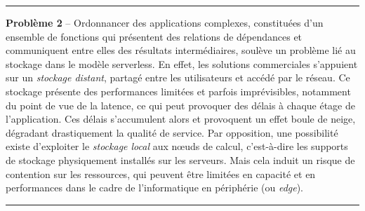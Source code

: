 
\begin{center}
    \rule{4cm}{0.4pt}
\end{center}

\textbf{Problème 2} -- Ordonnancer des applications complexes, constituées d'un ensemble de fonctions qui présentent des relations de dépendances et communiquent entre elles des résultats intermédiaires, soulève un problème lié au stockage dans le modèle serverless. En effet, les solutions commerciales s'appuient sur un \textit{stockage distant}, partagé entre les utilisateurs et accédé par le réseau. Ce stockage présente des performances limitées et parfois imprévisibles, notamment du point de vue de la latence, ce qui peut provoquer des délais à chaque étage de l'application. Ces délais s'accumulent alors et provoquent un effet boule de neige, dégradant drastiquement la qualité de service. Par opposition, une possibilité existe d'exploiter le \textit{stockage local} aux nœuds de calcul, c'est-à-dire les supports de stockage physiquement installés sur les serveurs. Mais cela induit un risque de contention sur les ressources, qui peuvent être limitées en capacité et en performances dans le cadre de l'informatique en périphérie (ou \textit{edge}).


\begin{center}
    \rule{4cm}{0.4pt}
\end{center}

